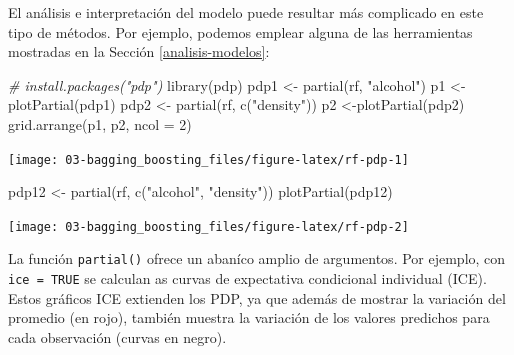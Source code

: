 \documentclass[
  spanish,
]{book}
\newenvironment{Shaded}{\begin{snugshade}}{\end{snugshade}}
\newcommand{\AttributeTok}[1]{\textcolor[rgb]{0.77,0.63,0.00}{#1}}
\newcommand{\CommentTok}[1]{\textcolor[rgb]{0.56,0.35,0.01}{\textit{#1}}}
\newcommand{\DecValTok}[1]{\textcolor[rgb]{0.00,0.00,0.81}{#1}}
\newcommand{\FunctionTok}[1]{\textcolor[rgb]{0.00,0.00,0.00}{#1}}
\newcommand{\NormalTok}[1]{#1}
\newcommand{\OtherTok}[1]{\textcolor[rgb]{0.56,0.35,0.01}{#1}}
\newcommand{\StringTok}[1]{\textcolor[rgb]{0.31,0.60,0.02}{#1}}
\theoremstyle{break}
\theoremstyle{definition}
\theoremstyle{definition}
\theoremstyle{definition}
\theoremstyle{definition}
\theoremstyle{remark}
\begin{document}
El análisis e interpretación del modelo puede resultar más complicado en este tipo de métodos.
Por ejemplo, podemos emplear alguna de las herramientas mostradas en la Sección \ref{analisis-modelos}:

\begin{Shaded}
\begin{Highlighting}[]
\CommentTok{\# install.packages("pdp")}
\FunctionTok{library}\NormalTok{(pdp)}
\NormalTok{pdp1 }\OtherTok{\textless{}{-}} \FunctionTok{partial}\NormalTok{(rf, }\StringTok{"alcohol"}\NormalTok{)}
\NormalTok{p1 }\OtherTok{\textless{}{-}} \FunctionTok{plotPartial}\NormalTok{(pdp1)}
\NormalTok{pdp2 }\OtherTok{\textless{}{-}} \FunctionTok{partial}\NormalTok{(rf, }\FunctionTok{c}\NormalTok{(}\StringTok{"density"}\NormalTok{))}
\NormalTok{p2 }\OtherTok{\textless{}{-}}\FunctionTok{plotPartial}\NormalTok{(pdp2)}
\FunctionTok{grid.arrange}\NormalTok{(p1, p2, }\AttributeTok{ncol =} \DecValTok{2}\NormalTok{)}
\end{Highlighting}
\end{Shaded}

\begin{center}\texttt{[image: 03-bagging\_boosting\_files/figure-latex/rf-pdp-1]} \end{center}

\begin{Shaded}
\begin{Highlighting}[]
\NormalTok{pdp12 }\OtherTok{\textless{}{-}} \FunctionTok{partial}\NormalTok{(rf, }\FunctionTok{c}\NormalTok{(}\StringTok{"alcohol"}\NormalTok{, }\StringTok{"density"}\NormalTok{))}
\FunctionTok{plotPartial}\NormalTok{(pdp12)}
\end{Highlighting}
\end{Shaded}

\begin{center}\texttt{[image: 03-bagging\_boosting\_files/figure-latex/rf-pdp-2]} \end{center}

La función \texttt{partial()} ofrece un abaníco amplio de argumentos. Por ejemplo, con \texttt{ice\ =\ TRUE} se calculan as curvas de expectativa condicional individual (ICE). Estos gráficos ICE extienden los PDP, ya que además de mostrar la variación del promedio (en rojo), también muestra la variación de los valores predichos para cada observación (curvas en negro).
\end{document}
